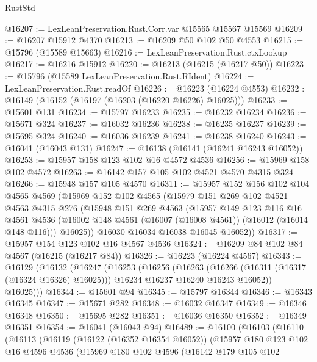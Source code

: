 \begin{lexlean}{RustStd}
\begin{coremodule}
@16207 := LexLeanPreservation.Rust.Corr.var @15565 @15567 @15569
@16209 := @16207 @15912 @4370
@16213 := @16209 @50 @102 @50 @4553
@16215 := @15796 (@15589 @15663)
@16216 := LexLeanPreservation.Rust.ctxLookup
@16217 := @16216 @15912
@16220 := @16213 (@16215 (@16217 @50))
@16223 := @15796 (@15589 LexLeanPreservation.Rust.RIdent)
@16224 := LexLeanPreservation.Rust.readOf
@16226 := @16223 (@16224 @4553)
@16232 := @16149 (@16152 (@16197 (@16203 (@16220 @16226) @16025)))
@16233 := @15601 @131
@16234 := @15797 @16233
@16235 := @16232 @16234
@16236 := @15671 @324
@16237 := @16032 @16236
@16238 := @16235 @16237
@16239 := @15695 @324
@16240 := @16036 @16239
@16241 := @16238 @16240
@16243 := @16041 (@16043 @131)
@16247 := @16138 (@16141 (@16241 @16243 @16052))
@16253 := @15957 @158 @123 @102 @16 @4572 @4536
@16256 := @15969 @158 @102 @4572
@16263 := @16142 @157 @105 @102 @4521 @4570 @4315 @324
@16266 := @15948 @157 @105 @4570
@16311 := @15957
    @152
    @156
    @102
    @104
    @4565
    @4569
    (@15969
      @152
      @102
      @4565
      (@15979
        @151
        @269
        @102
        @4521
        @4563
        @4315
        @276
        (@15948
          @151
          @269
          @4563
          (@15957
            @149
            @123
            @116
            @16
            @4561
            @4536
            (@16002 @148 @4561 (@16007 (@16008 @4561)) (@16012 (@16014 @148 @116)))
            @16025))
        @16030
        @16034
        @16038
        @16045
        @16052))
@16317 := @15957 @154 @123 @102 @16 @4567 @4536
@16324 := @16209 @84 @102 @84 @4567 (@16215 (@16217 @84))
@16326 := @16223 (@16224 @4567)
@16343 := @16129
    (@16132
      (@16247
        (@16253
          (@16256
            (@16263
              (@16266 (@16311 (@16317 (@16324 @16326) @16025)))
              @16234
              @16237
              @16240
              @16243
              @16052))
          @16025)))
@16344 := @15601 @94
@16345 := @15797 @16344
@16346 := @16343 @16345
@16347 := @15671 @282
@16348 := @16032 @16347
@16349 := @16346 @16348
@16350 := @15695 @282
@16351 := @16036 @16350
@16352 := @16349 @16351
@16354 := @16041 (@16043 @94)
@16489 := @16100
    (@16103
      (@16110
        (@16113
          (@16119
            (@16122 (@16352 @16354 @16052))
            (@15957
              @180
              @123
              @102
              @16
              @4596
              @4536
              (@15969
                @180
                @102
                @4596
                (@16142
                  @179
                  @105
                  @102

\end{coremodule}
\end{lexlean}
